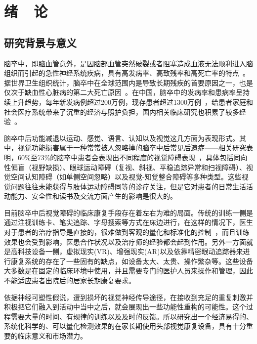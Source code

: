 \chapter{绪\ \ 论}

\section{研究背景与意义}

脑卒中，即脑血管意外，是因脑部血管突然破裂或者阻塞造成血液无法顺利进入脑组织而引起的急性神经系统疾病，具有高发病率、高致残率和高死亡率的特点~\cite{ji2025stroke}。据世界卫生组织统计，脑卒中在全球范围内是导致长期残疾的首要原因之一，也是仅次于缺血性心脏病的第二大死亡原因~\cite{thayabaranathan2023global}。在中国，脑卒中的发病率和患病率呈持续上升趋势，每年新发病例超过200万例，现存患者超过1300万例~\cite{ji2025stroke}，给患者家庭和社会医疗系统带来了沉重的经济与照护负担，国内相关临床研究也积累了较多经验~\cite{meng2025stroke}。

脑卒中后功能减退以运动、感觉、语言、认知以及视觉这几方面为表现形式。其中，视觉功能损害属于一种常常被人忽略掉的脑卒中后常见后遗症——相关研究表明，60\%至73\%的脑卒中患者会表现出不同程度的视觉障碍表现~\cite{rowe2021ivis,liu2023vision}，具体包括同向性偏盲（视野缺损）、眼球运动障碍（复视、斜视、平稳追踪异常和扫视障碍）、视觉空间认知障碍（如单侧空间忽略）以及视觉-知觉整合障碍等多种类型。这些视觉问题往往未能获得与肢体运动障碍同等的诊疗关注，但是它对患者的日常生活活动能力、安全性和读书及交流方面产生的影响是很大的。

目前脑卒中后视觉障碍的临床康复手段存在着左右为难的局面。传统的训练一侧是通过注视训练卡、笔尖追踪、字母搜索等方式在床边进行，在这样的情况下，医生对于患者的治疗指导是直接的，很难做到客观的量化和标准化的控制~\cite{liu2025headmount}，而且训练效果也会受到影响，医患合作状况以及治疗师的经验都会起到作用。另外一方面就是高科技设备一侧，虚拟现实(VR)、增强现实(AR)以及依靠精密眼动追踪器来进行康复系统的存在了一些固有的缺点，如设备太大、太贵、操作繁杂等。这些设备大多数是在固定的临床环境中使用，并且需要专门的医护人员来操作和管理，因此不能适应患者出院后的居家长期康复要求。

依据神经可塑性假说，遭到损坏的视觉神经传导途径，在接收到充足的重复刺激并积极把它们融入到活动中当中之后，就会展现出一些功能性重构的可能性。这个过程需要大量的时间、有规律的训练以及及时的反馈。所以研究出一个经济易得的、系统化科学的、可以量化检测效果的在家长期使用头部视觉康复设备，具有十分重要的临床意义和市场潜力。

